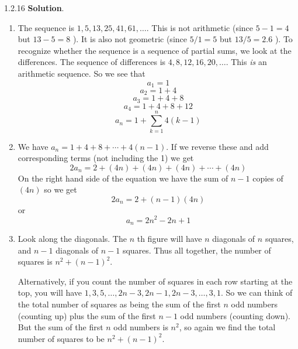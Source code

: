 \documentclass[11pt,]{book}
\theoremstyle{ptxplainnotitle}
\theoremstyle{ptxplaintitle}
\theoremstyle{ptxdefinitionnotitle}
\theoremstyle{ptxdefinitiontitle}
\theoremstyle{ptxdefinitionnotitle}
\theoremstyle{ptxdefinitiontitle}
\theoremstyle{ptxdefinitionnotitle}
\theoremstyle{ptxdefinitiontitle}
\theoremstyle{ptxdefinitiontitlenonumber}
\theoremstyle{ptxdefinitiontitlenonumber}
\numberwithin{equation}{chapter}
\begin{document}
\begin{divisionexercise}{1.2.16}
\textbf{Solution}.\quad%
\hypertarget{p-336}{}%
\leavevmode%
\begin{enumerate}[label=(\alph*)]
\item\hypertarget{li-195}{}\hypertarget{p-337}{}%
The sequence is \(1, 5, 13, 25, 41, 61, \ldots\).  This is not arithmetic (since \(5-1 = 4\) but \(13-5 = 8\) ).  It is also not geometric (since \(5/1 = 5\) but \(13/5 = 2.6\) ).  To recognize whether the sequence is a sequence of partial sums, we look at the differences.  The sequence of differences is \(4, 8, 12, 16, 20, \ldots\).  This {\em is} an arithmetic sequence.  So we see that%
\begin{equation*}
a_1 = 1
\end{equation*}
%
\begin{equation*}
a_2 = 1+4
\end{equation*}
%
\begin{equation*}
a_3 = 1+4+8
\end{equation*}
%
\begin{equation*}
a_4 = 1+4+8+12
\end{equation*}
%
\begin{equation*}
a_n = 1 + \sum_{k = 1}^n 4(k-1)
\end{equation*}
%
\item\hypertarget{li-196}{}\hypertarget{p-338}{}%
We have \(a_n = 1 + 4 + 8 + \cdots + 4(n-1)\).  If we reverse these and add corresponding terms (not including the 1) we get%
\begin{equation*}
2a_n = 2 + (4n) + (4n) + (4n) + \cdots + (4n)
\end{equation*}
On the right hand side of the equation we have the sum of \(n-1\) copies of \((4n)\) so we get%
\begin{equation*}
2a_n = 2 + (n-1)(4n)
\end{equation*}
or%
\begin{equation*}
a_n = 2n^2 - 2n + 1
\end{equation*}
%
\item\hypertarget{li-197}{}\hypertarget{p-339}{}%
Look along the diagonals.  The \(n\) th figure will have \(n\) diagonals of \(n\) squares, and \(n-1\) diagonals of \(n-1\) squares.  Thus all together, the number of squares is \(n^2 + (n-1)^2\).%
\par
\hypertarget{p-340}{}%
Alternatively, if you count the number of squares in each row starting at the top, you will have \(1, 3, 5, \ldots, 2n-3, 2n-1, 2n-3, \ldots, 3, 1\).  So we can think of the total number of squares as being the sum of the first \(n\) odd numbers (counting up) plus the sum of the first \(n-1\) odd numbers (counting down).  But the sum of the first \(n\) odd numbers is \(n^2\), so again we find the total number of squares to be \(n^2 + (n-1)^2\).%

\end{enumerate}
\end{divisionexercise}
\end{document}
